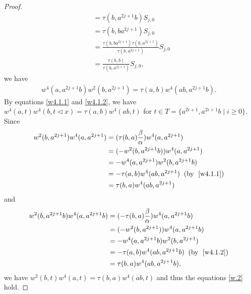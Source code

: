 \documentclass[a4paper,11pt]{amsart}
\numberwithin{equation}{section}
\begin{document}
\begin{proof}
\begin{align*}
&=\tau(b,a^{2j+1}b) S_{j,0}\\
&=\tau(b,ba^{2j+1}) S_{j,0}\\
&=\frac{\tau(b,ba^{2j+1}) \tau(b,a^{2j+1})}{\tau(b,a^{2j+1})} S_{j,0}\\
&=\frac{\tau(b,b)}{\tau(b,a^{2j+1})} S_{j,0},
\end{align*}
we have
\begin{align}
\label{w4.1.2} w^4(a,a^{2j+1}b) w^2(b,a^{2j+1})=\tau(a,b) w^4(ab,a^{2j+1}b).
\end{align}
 By equations \eqref{w4.1.1} and \eqref{w4.1.2}, we have $w^4(a,t)w^4(b,t\triangleleft x)=\tau(a,b) w^4(ab,t)$ for $t\in T=\{a^{2i+1},a^{2i+1}b\;|\;i\geq 0\}$. Since
\begin{align*}
w^2(b,a^{2j+1}) w^4(a,a^{2j+1})&=(\tau(b,a) \frac{\beta}{\alpha}) w^4(a,a^{2j+1})\\
&=(-w^2(b,a^{2j+1}b))w^4(a,a^{2j+1}) \\
&=-w^4(a,a^{2j+1}) w^2(b,a^{2j+1}b)\\
&=-\tau(a,b) w^4(ab,a^{2j+1})\;\;(\text{by }\;\eqref{w4.1.1})\\
&=\tau(b,a) w^4(ab,a^{2j+1})
\end{align*}
and
\begin{align*}
w^2(b,a^{2j+1}b) w^4(a,a^{2j+1}b)&=(-\tau(b,a) \frac{\beta}{\alpha}) w^4(a,a^{2j+1}b)\\
&=(-w^2(b,a^{2j+1}))w^4(a,a^{2j+1}b) \\
&=-w^4(a,a^{2j+1}b) w^2(b,a^{2j+1})\\
&=-\tau(a,b) w^4(ab,a^{2j+1}b)\;\;(\text{by }\;\eqref{w4.1.2})\\
&=\tau(b,a) w^4(ab,a^{2j+1}b),
\end{align*}
we have $w^2(b,t)w^4(a,t)=\tau(b,a)w^4(ab,t)$ and thus the equations \eqref{w.2} hold.


\end{proof}
\end{document}
